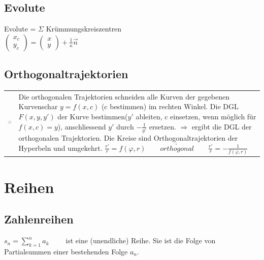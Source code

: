 \subsection{Evolute}
Evolute = $\Sigma$ Krümmungskreiszentren\\
$\left(\begin{matrix} x_c \\ y_c \end{matrix}\right) = \left(\begin{matrix} x \\  y \end{matrix}\right) + \frac{1}{\kappa}\overrightarrow{n}$

\subsection{Orthogonaltrajektorien}
\begin{tabular}{ll}
\parbox{2.5cm}{
\includegraphics[height=2.5cm]{./bilder/orthoTrajekt.png}
}
& \parbox{16.5cm}{
Die orthogonalen Trajektorien schneiden alle Kurven der gegebenen Kurvenschar
$y=f(x,c)$ (c bestimmen) im rechten Winkel.
Die DGL $F(x,y,y')$ der Kurve bestimmen($y'$ ableiten, c einsetzen, wenn möglich für $f(x,c) = y$), anschliessend $y'$ durch
$-\frac{1}{y'}$ ersetzen.
$\Rightarrow$ ergibt die DGL der orthogonalen Trajektorien.\\
Die Kreise sind Orthogonaltrajektorien der Hyperbeln und umgekehrt.\\
$\frac{r'}{r} = f(\varphi , r) \qquad \underrightarrow{orthogonal}  \qquad \frac{r'}{r} = - \frac{1}{f(\varphi , r)}$
}
\end{tabular}

\section{Reihen}

\subsection{Zahlenreihen}
$ s_n = \sum\limits_{k=1}^{n} a_k \qquad $ ist eine (unendliche) Reihe. Sie ist die Folge von Partialsummen einer bestehenden Folge $a_n$.

